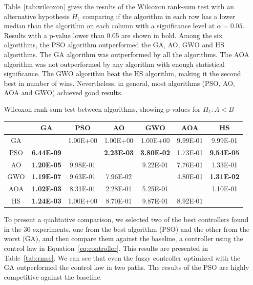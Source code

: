 \documentclass[symmetry,article,submit,moreauthors,pdftex]{Definitions/mdpi}
\begin{document}
Table~\ref{tab:wilcoxon} gives the results of the Wilcoxon rank-sum test with
an alternative hypothesis $H_1$ comparing if the algorithm in each row has a
lower median than the algorithm on each column with a significance level at
$\alpha = 0.05$. Results with a p-value lower than 0.05 are shown in bold.
Among the six algorithms, the PSO algorithm outperformed the GA, AO, GWO and HS
algorithms. The GA algorithm was outperformed by all the algorithms. The AOA
algorithm was not outperformed by any algorithm with enough statistical
significance. The GWO algorithm beat the HS algorithm, making it the second
best in number of wins.  Nevertheless, in general, most algorithms (PSO, AO,
AOA and GWO) achieved good results.

\begin{specialtable}[H] 
\small
\centering
\caption{Wilcoxon rank-sum test between algorithms, showing p-values for $H_1:A<B$}\label{tab:wilcoxon} 
\begin{tabular}{ccccccc}
\toprule 
    & GA       & PSO      & AO       & GWO      & AOA      & HS       \\
\midrule
GA  &          & 1.00E+00 & 1.00E+00 & 1.00E+00 & 9.99E-01 & 9.99E-01 \\
\midrule
PSO & \textbf{6.44E-09} &          & \textbf{2.23E-03} & \textbf{3.80E-02} & 1.73E-01 & \textbf{9.54E-05} \\
\midrule
AO  & \textbf{1.20E-05} & 9.98E-01 &          & 9.22E-01 & 7.76E-01 & 1.33E-01 \\
\midrule
GWO & \textbf{1.19E-07} & 9.63E-01 & 7.96E-02 &          & 4.80E-01 & \textbf{1.31E-02} \\
\midrule
AOA & \textbf{1.02E-03} & 8.31E-01 & 2.28E-01 & 5.25E-01 &          & 1.10E-01 \\
\midrule
HS  & \textbf{1.24E-03} & 1.00E+00 & 8.70E-01 & 9.87E-01 & 8.92E-01 &          \\
\bottomrule
\end{tabular}
\end{specialtable}

To present a qualitative comparison, we selected two of the best controllers
found in the 30 experiments,  one from the best algorithm (PSO) and the other
from the worst (GA), and then compare them against the baseline, a controller
using the control law in Equation~\ref{eq:controller}. This results are
presented in Table~\ref{tab:rmse}. We can see that even the fuzzy controller
optimized with the GA outperformed the control law in two paths. The results 
of the PSO are highly competitive against the baseline.
\end{document}
